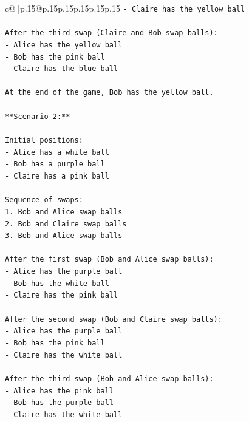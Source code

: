\documentclass{article}
\begin{document}
{\begin{supertabular}{c@{$\;$}|p{.15\linewidth}@{}p{.15\linewidth}p{.15\linewidth}p{.15\linewidth}p{.15\linewidth}p{.15\linewidth}}
{{{\texttt{{-} Claire has the yellow ball} \\
\\ 
\texttt{After the third swap (Claire and Bob swap balls):} \\
\texttt{{-} Alice has the yellow ball} \\
\texttt{{-} Bob has the pink ball} \\
\texttt{{-} Claire has the blue ball} \\
\\ 
\texttt{At the end of the game, Bob has the yellow ball.} \\
\\ 
\texttt{**Scenario 2:**} \\
\\ 
\texttt{Initial positions:} \\
\texttt{{-} Alice has a white ball} \\
\texttt{{-} Bob has a purple ball} \\
\texttt{{-} Claire has a pink ball} \\
\\ 
\texttt{Sequence of swaps:} \\
\texttt{1. Bob and Alice swap balls} \\
\texttt{2. Bob and Claire swap balls} \\
\texttt{3. Bob and Alice swap balls} \\
\\ 
\texttt{After the first swap (Bob and Alice swap balls):} \\
\texttt{{-} Alice has the purple ball} \\
\texttt{{-} Bob has the white ball} \\
\texttt{{-} Claire has the pink ball} \\
\\ 
\texttt{After the second swap (Bob and Claire swap balls):} \\
\texttt{{-} Alice has the purple ball} \\
\texttt{{-} Bob has the pink ball} \\
\texttt{{-} Claire has the white ball} \\
\\ 
\texttt{After the third swap (Bob and Alice swap balls):} \\
\texttt{{-} Alice has the pink ball} \\
\texttt{{-} Bob has the purple ball} \\
\texttt{{-} Claire has the white ball} \\
\\ 
}}}
\end{supertabular}}
\end{document}
